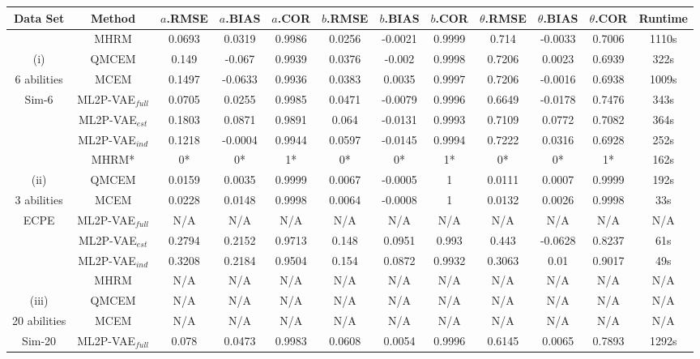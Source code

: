 \begin{table}
\footnotesize{
\centering
\begin{tabular}{c|c|ccc|ccc|ccc|c}
    Data Set & Method & $a$.RMSE & $a$.BIAS & $a$.COR & $b$.RMSE & $b$.BIAS & $b$.COR &  $\theta$.RMSE & $\theta$.BIAS & $\theta$.COR & Runtime \\
    \hline
& MHRM & 0.0693 & 0.0319  & 0.9986   & 0.0256 & -0.0021 & 0.9999  & 0.714  & -0.0033  & 0.7006 & 1110s \\ 
(i)& QMCEM & 0.149 & -0.067 & 0.9939 & 0.0376 & -0.002 & 0.9998 & 0.7206 & 0.0023 & 0.6939 & 322s\\
6 abilities& MCEM & 0.1497 & -0.0633 &  0.9936 &  0.0383 & 0.0035 & 0.9997 &  0.7206 & -0.0016 & 0.6938 & 1009s\\
Sim-6& ML2P-VAE$_{full}$ & 0.0705 &  0.0255  & 0.9985   & 0.0471 & -0.0079 & 0.9996  & 0.6649   & -0.0178  & 0.7476 & 343s\\
& ML2P-VAE$_{est}$ & 0.1803 & 0.0871  & 0.9891 &  0.064 & -0.0131 & 0.9993  & 0.7109 &  0.0772  & 0.7082 & 364s \\
& ML2P-VAE$_{ind}$ & 0.1218 & -0.0004 & 0.9944   & 0.0597 & -0.0145 & 0.9994  & 0.7222 &  0.0316  & 0.6928 & 252s\\
\hline 
& MHRM* & 0* & 0*&  1* &  0* &  0* &  1* & 0* & 0* &  1* & 162s \\
(ii)& QMCEM & 0.0159  & 0.0035 & 0.9999 & 0.0067  & -0.0005 & 1   & 0.0111 & 0.0007 & 0.9999 & 192s\\
3 abilities & MCEM & 0.0228 & 0.0148 & 0.9998 & 0.0064  & -0.0008 & 1   & 0.0132 & 0.0026 & 0.9998 & 33s \\
ECPE & ML2P-VAE$_{full}$ & N/A & N/A & N/A & N/A & N/A & N/A & N/A & N/A & N/A & N/A  \\
& ML2P-VAE$_{est}$ & 0.2794 & 0.2152 & 0.9713 & 0.148 & 0.0951  & 0.993 & 0.443 & -0.0628 & 0.8237 & 61s  \\
& ML2P-VAE$_{ind}$ & 0.3208 & 0.2184 & 0.9504 & 0.154 & 0.0872  & 0.9932  & 0.3063 & 0.01 & 0.9017 & 49s \\
\hline
& MHRM & N/A & N/A & N/A & N/A & N/A & N/A & N/A & N/A & N/A & N/A  \\
(iii)& QMCEM & N/A & N/A & N/A & N/A & N/A & N/A & N/A & N/A & N/A & N/A \\
20 abilities & MCEM & N/A & N/A & N/A & N/A & N/A & N/A & N/A & N/A & N/A & N/A  \\
Sim-20 & ML2P-VAE$_{full}$ & 0.078 &  0.0473  & 0.9983  & 0.0608 &  0.0054  & 0.9996  & 0.6145 &  0.0065  & 0.7893 & 1292s \\

\end{tabular}}
\end{table}
